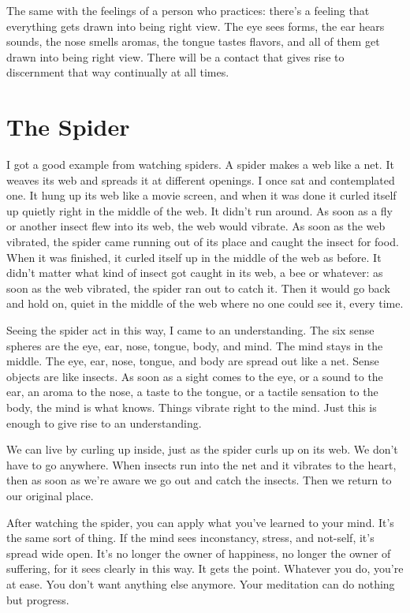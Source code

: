 The same with the feelings of a person who practices: there's a feeling that everything gets drawn into being right view. The eye sees forms, the ear hears sounds, the nose smells aromas, the tongue tastes flavors, and all of them get drawn into being right view. There will be a contact that gives rise to discernment that way continually at all times. 

\clearpage

\section{The Spider}

I got a good example from watching spiders. A spider makes a web like a net. It weaves its web and spreads it at different openings. I once sat and contemplated one. It hung up its web like a movie screen, and when it was done it curled itself up quietly right in the middle of the web. It didn't run around. As soon as a fly or another insect flew into its web, the web would vibrate. As soon as the web vibrated, the spider came running out of its place and caught the insect for food. When it was finished, it curled itself up in the middle of the web as before. It didn't matter what kind of insect got caught in its web, a bee or whatever: as soon as the web vibrated, the spider ran out to catch it. Then it would go back and hold on, quiet in the middle of the web where no one could see it, every time. 

Seeing the spider act in this way, I came to an understanding. The six sense spheres are the eye, ear, nose, tongue, body, and mind. The mind stays in the middle. The eye, ear, nose, tongue, and body are spread out like a net. Sense objects are like insects. As soon as a sight comes to the eye, or a sound to the ear, an aroma to the nose, a taste to the tongue, or a tactile sensation to the body, the mind is what knows. Things vibrate right to the mind. Just this is enough to give rise to an understanding.

We can live by curling up inside, just as the spider curls up on its web. We don't have to go anywhere. When insects run into the net and it vibrates to the heart, then as soon as we're aware we go out and catch the insects. Then we return to our original place.

After watching the spider, you can apply what you've learned to your mind. It's the same sort of thing. If the mind sees inconstancy, stress, and not-self, it's spread wide open. It's no longer the owner of happiness, no longer the owner of suffering, for it sees clearly in this way. It gets the point. Whatever you do, you're at ease. You don't want anything else anymore. Your meditation can do nothing but progress.


